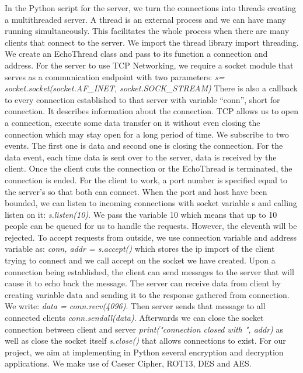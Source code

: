 In the Python script for the server, we turn the connections into threads creating a multithreaded server. A thread is an external process and we can have many running simultaneously. This facilitates the whole process when there are many clients that connect to the server. We import the thread library import threading. We create an EchoThread class and pass to its function a connection and address. For the server to use TCP Networking, we require a socket module that serves as a communication endpoint with two parameters:
\textit{s= socket.socket(socket.AF_INET, socket.SOCK_STREAM)}
There is also a callback to every connection established to that server with variable “conn”, short for connection. It describes information about the connection. TCP allows us to open a connection, execute some data transfer on it without even closing the connection which may stay open for a long period of time. We subscribe to two events. The first one is data and second one is closing the connection. For the data event, each time data is sent over to the server, data is received by the client. Once the client cuts the connection or the EchoThread is terminated, the connection is ended.
For the client to work, a port number is specified equal to the server’s so that both can connect. When the port and host have been bounded, we can listen to incoming connections with socket variable s and calling listen on it: \textit{s.listen(10)}. We pass the variable 10 which means that up to 10 people can be queued for us to handle the requests. However, the eleventh will be rejected. To accept requests from outside, we use connection variable and address variable as: \textit{conn, addr = s.accept()} which stores the ip import of the client trying to connect and we call accept on the socket we have created. Upon a connection being established, the client can send messages to the server that will cause it to echo back the message. The server can receive data from client by creating variable data and sending it to the response gathered from connection. We write: \textit{data = conn.recv(4096)}. Then server sends that message to all connected clients \textit{conn.sendall(data)}. Afterwards we can close the socket connection between client and server \textit{print("connection closed with ", addr)} as well as close the socket itself \textit{s.close()} that allows connections to exist.
For our project, we aim at implementing in Python several encryption and decryption applications. We make use of Caeser Cipher, ROT13, DES and AES.
